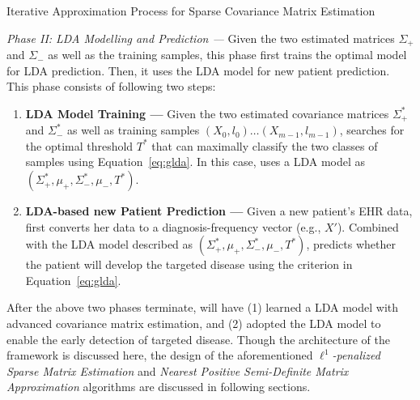 \begin{algorithm}
\caption{Iterative Approximation Process for Sparse Covariance Matrix Estimation}
\label{alg:iap}
\end{algorithm}


\emph{Phase II: LDA Modelling and Prediction --- } Given the two estimated matrices $\Sigma_+$ and $\Sigma_-$ as well as the training samples, this phase first trains the optimal model for LDA prediction. 
Then, it uses the LDA model for new patient prediction. 
This phase consists of following two steps:
\begin{enumerate}
    \item \textbf{LDA Model Training --- } Given the two estimated covariance matrices $\Sigma_+^*$ and $\Sigma_-^*$ as well as training samples $(X_0,l_0)\dots (X_{m-1},l_{m-1})$, \TheName{} searches for the optimal threshold $T^*$ that can maximally classify the two classes of samples using Equation~\ref{eq:glda}. 
        In this case, \TheName{} uses a LDA model as $(\Sigma_+^*,\mu_+,\Sigma_-^*,\mu_-,T^*)$.
    \item \textbf{LDA-based new Patient Prediction --- } Given a new patient's EHR data, \TheName{} first converts her data to a diagnosis-frequency vector (e.g., $X'$). 
        Combined with the LDA model described as $(\Sigma_+^*,\mu_+,\Sigma_-^*,\mu_-,T^*)$, \TheName{} predicts whether the patient will develop the targeted disease using the criterion in Equation~\ref{eq:glda}.
\end{enumerate}
%

After the above two phases terminate, \TheName{} will have (1) learned a LDA model with advanced covariance matrix estimation, and (2)  adopted the LDA model to enable the early detection of targeted disease. 
Though the architecture of the framework is discussed here, the design of the aforementioned \emph{$\ell^1$-penalized Sparse Matrix Estimation} and \emph{Nearest Positive Semi-Definite Matrix Approximation} algorithms are discussed in following sections.

